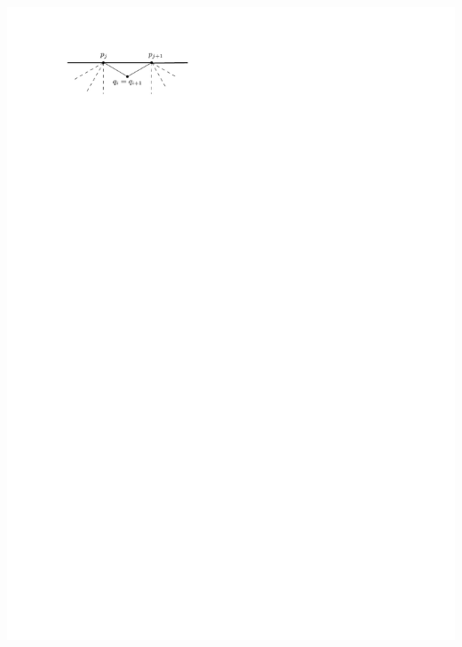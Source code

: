 \documentclass[a4paper]{article}
\begin{document}
\includegraphics[width=\linewidth]{unifiedAlgo/img/walkProofB}
\clearpage%
\end{document}
